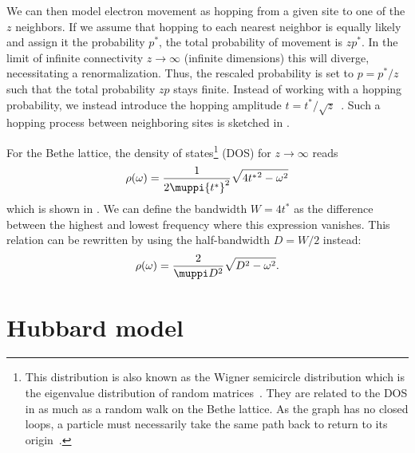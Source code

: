 We can then model electron movement as hopping from a given site to
one of the $z$ neighbors.
If we assume that hopping to each nearest neighbor is equally likely and assign it the probability $p^*$,
the total probability of movement is $zp^*$.
In the limit of infinite connectivity $z\to\infty$ (infinite dimensions) this will diverge,
necessitating a renormalization.
Thus, the rescaled probability is set to $p = p^*/z$ such that
the total probability $zp$ stays finite.
Instead of working with a hopping probability,
we instead introduce the hopping amplitude $t = t^*/\sqrt{z}$~\cite{Held2007}.
Such a hopping process between neighboring sites is sketched in .

For the Bethe lattice, the density of states\footnote{
    This distribution is also known as the Wigner semicircle distribution
    which is the eigenvalue distribution of random matrices~\cite{Wigner1955, Mehta2004}.
    They are related to the DOS in as much as a random walk on the Bethe lattice.
    As the graph has no closed loops,
    a particle must necessarily take the same path back to return to its origin~\cite{Wallerberger2025}.
}
(DOS) for $z\to\infty$ reads~\cite{Eckstein2005}
\begin{equation}
    \rho(\omega) = \frac{1}{2\muppi {t^*}^2} \sqrt{4{t^*}^2 - \omega^2}
\end{equation}
which is shown in .
We can define the bandwidth $W=4t^*$ as the difference between the highest and lowest frequency
where this expression vanishes.
This relation can be rewritten by using the half-bandwidth $D = W/2$ instead:
\begin{equation}
    \rho(\omega) = \frac{2}{\muppi D^2} \sqrt{D^2 - \omega^2}.
    \label{eq:dos-semicircle}
\end{equation}

\section{Hubbard model}%
\label{sec:hubbard-model}

